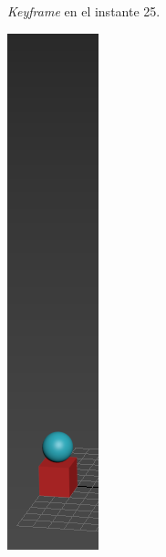 \documentclass{article}
\begin{document}
\begin{figure}[H]
\begin{subfigure}[H]{0.15\textwidth}
	    \caption{\textit{Keyframe} en el instante 25.}
	\end{subfigure}
    \hfill
	\begin{subfigure}[H]{0.15\textwidth}
	    \centering
	    \includegraphics[width=\textwidth]{imagenes/p1_ins15.png}

\end{subfigure}
\end{figure}
\end{document}
